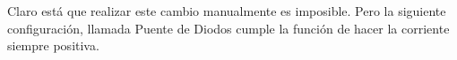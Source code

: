 \documentclass[a5paper,12pt,twoside]{book}
\begin{document}
\begin{center}
    \def\svgwidth{0.6\linewidth}
    
\end{center}

Claro está que realizar este cambio manualmente es imposible. Pero la siguiente configuración, llamada Puente de Diodos cumple la función de hacer la corriente siempre positiva.

\begin{center}
    \def\svgwidth{0.6\linewidth}
    
\end{center}
\end{document}
